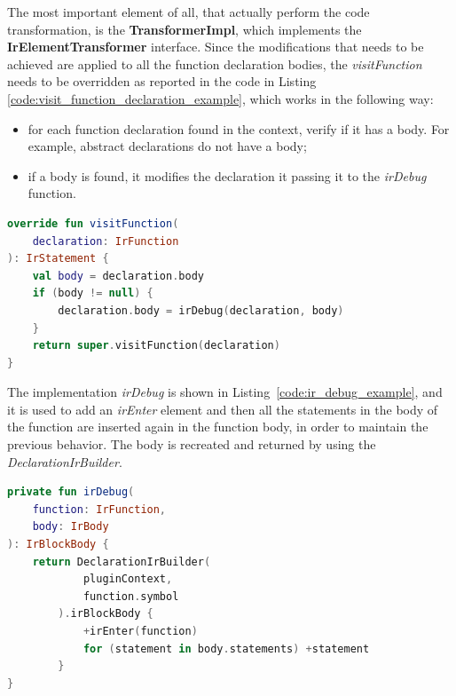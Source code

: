The most important element of all, that actually perform the code transformation, is the \textbf{TransformerImpl}, which implements the \textbf{IrElementTransformer} interface.\newline
Since the modifications that needs to be achieved are applied to all the function declaration bodies, the \textit{visitFunction} needs to be overridden as reported in the code in Listing \ref{code:visit_function_declaration_example}, which works in the following way:
\begin{itemize}
    \item for each function declaration found in the context, verify if it has a body. For example, abstract declarations do not have a body;
    \item if a body is found, it modifies the declaration it passing it to the \textit{irDebug} function.
\end{itemize}

\begin{lstlisting}[caption={Example of \textit{visitFunction} implementation of the transformer, used to visit all the function declarations}, captionpos=b, language=Kotlin, label={code:visit_function_declaration_example}]
override fun visitFunction(
    declaration: IrFunction
): IrStatement {
    val body = declaration.body
    if (body != null) {
        declaration.body = irDebug(declaration, body)
    }
    return super.visitFunction(declaration)
}
\end{lstlisting}

The implementation \textit{irDebug} is shown in Listing~\ref{code:ir_debug_example}, and it is used to add an \textit{irEnter} element and then all the statements in the body of the function are inserted again in the function body, in order to maintain the previous behavior. The body is recreated and returned by using the \textit{DeclarationIrBuilder}.

\begin{lstlisting}[caption={Example of implementation of a function that adds a new element into the function body}, captionpos=b, language=Kotlin, label={code:ir_debug_example}]
private fun irDebug(
    function: IrFunction,
    body: IrBody
): IrBlockBody {
    return DeclarationIrBuilder(
            pluginContext,
            function.symbol
        ).irBlockBody {
            +irEnter(function)
            for (statement in body.statements) +statement
        }
}
\end{lstlisting}

